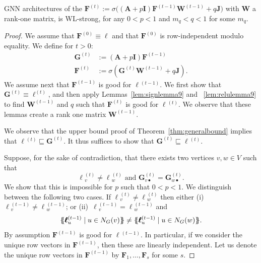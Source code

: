 \begin{theorem}
GNN architectures of the $\mathbf{F}^{(t)}:=\sigma\bigl((\mathbf{A}+p\mathbf{I})\mathbf{F}^{(t-1)}\mathbf{W}^{(t-1)} +q\mathbf{J}\bigr)$ with $\mathbf{W}$ a rank-one matrix, is WL-strong, for any $0<p<1$ and $m_q<q<1$ for some $m_q$.
\end{theorem}
\begin{proof}
We assume that $\mathbf{F}^{(0)}\equiv\pmb{\ell}$ and that  $\mathbf{F}^{(0)}$ is row-independent modulo equality. We define for $t>0$:
	\begin{align*}
	\mathbf{G}^{(t)}&:=(\mathbf{A}+p\mathbf{I})\mathbf{F}^{(t-1)}\\
	\mathbf{F}^{(t)}&:=\sigma(\mathbf{G}^{(t)}\mathbf{W}^{(t-1)}+q\mathbf{J}).
	\end{align*}
We assume next that $\mathbf{F}^{(t-1)}$ is good for $\pmb{\ell}{}^{(t-1)}$. We first show that
$\mathbf{G}^{(t)}\equiv\pmb{\ell}^{(t)}$, and then apply
	Lemmas~\ref{lem:signlemma9} and
	~\ref{lem:relulemma9} to find $\mathbf{W}^{(t-1)}$ and $q$ such that $\mathbf{F}^{(t)}$ is good for  $\pmb{\ell}{}^{(t)}$. We observe that these lemmas create a rank one matrix $\mathbf{W}^{(t-1)}$.


We observe that the upper bound proof of Theorem~\ref{thm:generalbound}  implies that  $\pmb{\ell}{}^{(t)}\sqsubseteq \mathbf{G}^{(t)}$. It thus suffices to show that $ \mathbf{G}^{(t)}\sqsubseteq \pmb{\ell}{}^{(t)}$.

Suppose, for the sake of contradiction, that there exists two vertices $v,w\in V$ such that 
	\begin{equation}
	\pmb{\ell}{}^{(t)}_v\neq\pmb{\ell}{}^{(t)}_w \text{ and }
	\mathbf{G}^{(t)}_{v\bullet}=\mathbf{G}^{(t)}_{w\bullet}. \label{eq:contra}
	\end{equation} 
We show that this is impossible for $p$ such that $0<p<1$. We distinguish between the following two cases. If $\pmb{\ell}{}^{(t)}_v\neq\pmb{\ell}{}^{(t)}_w$ then either
(i)~$\pmb{\ell}{}^{(t-1)}_v\neq\pmb{\ell}{}^{(t-1)}_w$; or 
(ii)~$\pmb{\ell}{}^{(t-1)}_v=\pmb{\ell}{}^{(t-1)}_w$ and
	$$
	\ldbl \pmb{\ell}{}^{(t-1)}_{u} \st u \in N_G(v) \rdbl\neq
	\ldbl \pmb{\ell}{}^{(t-1)}_{u} \st u \in N_G(w) \rdbl.
	$$
By assumption $\mathbf{F}^{(t-1)}$ is good for $\pmb{\ell}{}^{(t-1)}$.
In particular, if we consider the unique row vectors in  $\mathbf{F}^{(t-1)}$, then these are linearly independent. Let us denote the unique row vectors in $\mathbf{F}^{(t-1)}$ by $\mathbf{F}_1,\ldots,\mathbf{F}_s$ for some $s$.



\end{proof}
